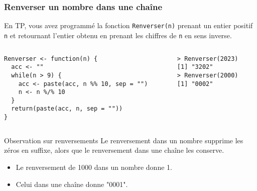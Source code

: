 \documentclass[10pt]{beamer}
\begin{document}
\begin{frame}[fragile]
  \frametitle{Renverser un nombre dans une chaîne}
  En TP, vous avez programmé la fonction \texttt{Renverser(n)} prenant un entier positif \texttt{n} et retournant l’entier obtenu en prenant les chiffres de \texttt{n} en sens inverse.


\begin{columns}[c]
\begin{column}{0.67\textwidth}
  \begin{lstlisting}[style=edblock]
Renverser <- function(n) {
  acc <- ""
  while(n > 9) {
    acc <- paste(acc, n %% 10, sep = "")
    n <- n %/% 10
  }
  return(paste(acc, n, sep = ""))
}
\end{lstlisting}

\end{column}
\begin{column}{0.29\textwidth}
\begin{lstlisting}
> Renverser(2023)
[1] "3202"
> Renverser(2000)
[1] "0002"
\end{lstlisting}
\end{column}
\end{columns}

\begin{block}{Observation sur renversements}
  Le renversement dans un nombre supprime les zéros en suffixe, alors que le renversement dans une chaîne les conserve.
  \begin{itemize}
  \item Le renversement de 1000 dans un nombre donne 1.
  \item Celui dans une chaîne donne "0001".
  \end{itemize}
\end{block}



\end{frame}
\end{document}
